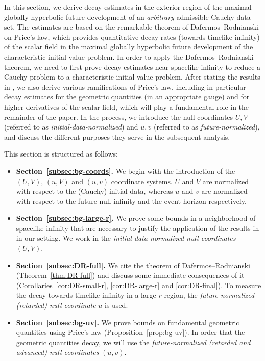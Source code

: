 \documentclass[10pt, reqno]{amsart}
\theoremstyle{definition}
\theoremstyle{remark}
\theoremstyle{conjecture}
\numberwithin{equation}{section}
\newcommand{\0}{\emptyset}
\begin{document}
In this section, we derive decay estimates in the exterior region of the maximal globally hyperbolic future development of an \emph{arbitrary} admissible Cauchy data set. The estimates are based on the remarkable theorem of Dafermos--Rodnianski \cite{DRPL} on Price's law, which provides quantitative decay rates (towards timelike infinity) of the scalar field in the maximal globally hyperbolic future development of the characteristic initial value problem. In order to apply the Dafermos--Rodnianski theorem, we need to first prove decay estimates near spacelike infinity to reduce a Cauchy problem to a characteristic initial value problem. After stating the results in \cite{DRPL}, we also derive various ramifications of Price's law, including in particular decay estimates for the geometric quantities (in an appropriate gauge) and for higher derivatives of the scalar field, which will play a fundamental role in the remainder of the paper. In the process, we introduce the null coordinates $U, V$ (referred to as \emph{initial-data-normalized}) and $u, v$ (referred to as \emph{future-normalized}), and discuss the different purposes they serve in the subsequent analysis.


This section is structured as follows:
\begin{itemize}
\item {\bf Section~\ref{subsec:bg-coords}.} We begin with the introduction of the $(U,V)$, $(u,V)$ and $(u,v)$ coordinate systems. $U$ and $V$ are normalized with respect to the (Cauchy) initial data, whereas $u$ and $v$ are normalized with respect to the future null infinity and the event horizon respectively.
\item {\bf Section~\ref{subsec:bg-large-r}.} We prove some bounds in a neighborhood of spacelike infinity that are necessary to justify the application of the results in \cite{DRPL} in our setting. We work in the \emph{initial-data-normalized null coordinates} $(U, V)$.
\item {\bf Section~\ref{subsec:DR-full}.} We cite the theorem of Dafermos--Rodnianski (Theorem~\ref{thm:DR-full}) and discuss some immediate consequences of it (Corollaries~\ref{cor:DR-small-r}, \ref{cor:DR-large-r} and \ref{cor:DR-final}). To measure the decay towards timelike infinity in a large $r$ region, the \emph{future-normalized (retarded) null coordinate} $u$ is used.
\item {\bf Section~\ref{subsec:bg-uv}.} We prove bounds on fundamental geometric quantities using Price's law (Proposition~\ref{prop:bg-uv}). In order that the geometric quantities decay, we will use the \emph{future-normalized (retarded and advanced) null coordinates} $(u,v)$.
\end{itemize}
\end{document}
